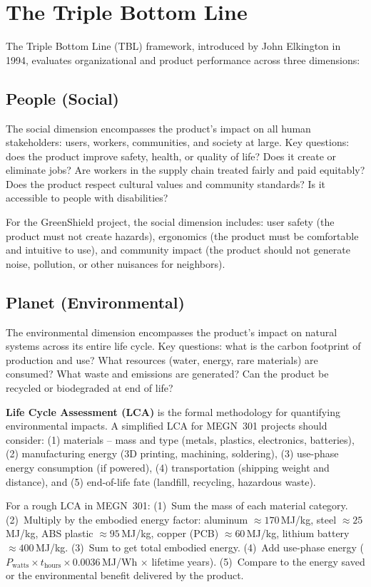 \documentclass[11pt,letterpaper,twoside,openany]{book}
\begin{document}
\section{The Triple Bottom Line}
The Triple Bottom Line (TBL) framework, introduced by John Elkington in 1994, evaluates organizational and product performance across three dimensions:

\subsection{People (Social)}
The social dimension encompasses the product's impact on all human stakeholders: users, workers, communities, and society at large. Key questions: does the product improve safety, health, or quality of life? Does it create or eliminate jobs? Are workers in the supply chain treated fairly and paid equitably? Does the product respect cultural values and community standards? Is it accessible to people with disabilities?

For the GreenShield project, the social dimension includes: user safety (the product must not create hazards), ergonomics (the product must be comfortable and intuitive to use), and community impact (the product should not generate noise, pollution, or other nuisances for neighbors).

\subsection{Planet (Environmental)}
The environmental dimension encompasses the product's impact on natural systems across its entire life cycle. Key questions: what is the carbon footprint of production and use? What resources (water, energy, rare materials) are consumed? What waste and emissions are generated? Can the product be recycled or biodegraded at end of life?

\textbf{Life Cycle Assessment (LCA)} is the formal methodology for quantifying environmental impacts. A simplified LCA for MEGN~301 projects should consider: (1) materials -- mass and type (metals, plastics, electronics, batteries), (2) manufacturing energy (3D printing, machining, soldering), (3) use-phase energy consumption (if powered), (4) transportation (shipping weight and distance), and (5) end-of-life fate (landfill, recycling, hazardous waste).

\begin{tipbox}
For a rough LCA in MEGN~301: (1)~Sum the mass of each material category. (2)~Multiply by the embodied energy factor: aluminum $\approx 170$\,MJ/kg, steel $\approx 25$\,MJ/kg, ABS plastic $\approx 95$\,MJ/kg, copper (PCB) $\approx 60$\,MJ/kg, lithium battery $\approx 400$\,MJ/kg. (3)~Sum to get total embodied energy. (4)~Add use-phase energy ($P_{\text{watts}} \times t_{\text{hours}} \times 0.0036$\,MJ/Wh $\times$ lifetime years). (5)~Compare to the energy saved or the environmental benefit delivered by the product.
\end{tipbox}
\end{document}
